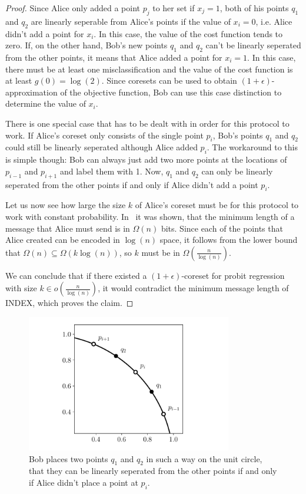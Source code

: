 \begin{proof}
    Since Alice only added a point $p_j$ to her set if $x_j = 1$, both
    of his points $q_1$ and $q_2$ are linearly seperable from Alice's points if
    the value of $x_i = 0$, i.e. Alice didn't add a point for $x_i$.
    In this case, the value of the cost function tends to zero.
    If, on the other hand, Bob's new points $q_1$ and $q_2$ can't be linearly
    seperated from the other points, it means that Alice added a point
    for $x_i = 1$. In this case, there must be at least one
    misclassification and the value of the cost function is at least
    $g(0) = \log(2)$.
    Since coresets can be used to obtain $(1 + \epsilon)$-approximation
    of the objective function, Bob can use this case distinction to
    determine the value of $x_i$.

    There is one special case that has to be dealt with in order for this
    protocol to work. If Alice's coreset only consists of the single point
    $p_i$, Bob's points $q_1$ and $q_2$ could still be linearly seperated
    although Alice added $p_i$.
    The workaround to this is simple though:
    Bob can always just add two more
    points at the locations of $p_{i-1}$ and $p_{i+1}$ and label them with 1.
    Now, $q_1$ and $q_2$ can only be linearly seperated from the
    other points if and only if Alice didn't add a point $p_i$.

    Let us now see how large the size $k$ of Alice's coreset must be
    for this protocol to work with constant probability.
    In~\cite{index} it was shown, that the minimum length of a message
    that Alice must send is in $\Omega(n)$ bits.
    Since each of the points that Alice created can be encoded in
    $\log(n)$ space, it follows from the lower bound that
    $\Omega(n) \subseteq \Omega(k \log(n))$, so $k$ must be in
    $\Omega\left(\frac{n}{\log(n)}\right)$.

    We can conclude that if there existed a $(1 + \epsilon)$-coreset
    for probit regression with size $k \in o\left(\frac{n}{\log(n)}\right)$,
    it would contradict the minimum message length of
    INDEX, which proves the claim.
\end{proof}

\begin{figure}
    \centering
    \includegraphics[width=0.8\textwidth]{figures/index.pdf}
    \caption{Bob places two points $q_1$ and $q_2$ in such a way
        on the unit circle, that they can be linearly seperated from the other
        points if and only if Alice didn't place a point at $p_i$.}
    \label{fig:index}
\end{figure}


